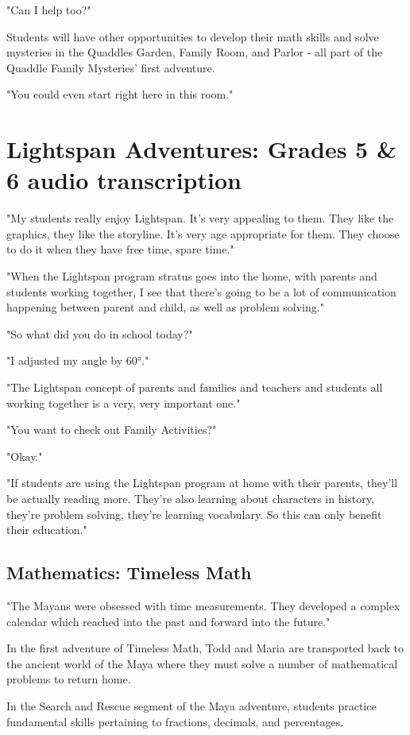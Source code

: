 "Can I help too?"

Students will have other opportunities to develop their math skills and solve mysteries in the Quaddles Garden, Family Room, and Parlor - all part of the Quaddle Family Mysteries' first adventure.

"You could even start right here in this room."

\section{Lightspan Adventures: Grades 5 \& 6 audio transcription}

"My students really enjoy Lightspan.
It's very appealing to them.
They like the graphics, they like the storyline.
It's very age appropriate for them.
They choose to do it when they have free time, spare time."

"When the Lightspan program stratus goes into the home, with parents and students working together, I see that there's going to be a lot of communication happening between parent and child, as well as problem solving."

"So what did you do in school today?"

"I adjusted my angle by 60°."

"The Lightspan concept of parents and families and teachers and students all working together is a very, very important one."

"You want to check out Family Activities?"

"Okay."

"If students are using the Lightspan program at home with their parents, they'll be actually reading more.
They're also learning about characters in history, they're problem solving, they're learning vocabulary.
So this can only benefit their education."

\subsection{Mathematics: Timeless Math}

"The Mayans were obsessed with time measurements.
They developed a complex calendar which reached into the past and forward into the future."

In the first adventure of Timeless Math, Todd and Maria are transported back to the ancient world of the Maya where they must solve a number of mathematical problems to return home.

In the Search and Rescue segment of the Maya adventure, students practice fundamental skills pertaining to fractions, decimals, and percentages.


